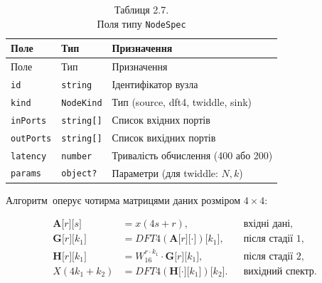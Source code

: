 \documentclass[
]{article}
\begin{document}
\begin{longtable}[]{@{}
  >{\raggedright\arraybackslash}p{}
  >{\raggedright\arraybackslash}p{}
  >{\raggedright\arraybackslash}p{}@{}}
\caption{Таблиця 2.7.\\
Поля типу \protect\texttt{NodeSpec}}\tabularnewline
\toprule\noalign{}
\begin{minipage}[b]{\linewidth}\raggedright
Поле
\end{minipage} & \begin{minipage}[b]{\linewidth}\raggedright
Тип
\end{minipage} & \begin{minipage}[b]{\linewidth}\raggedright
Призначення
\end{minipage} \\
\midrule\noalign{}
\endfirsthead
\toprule\noalign{}
\begin{minipage}[b]{\linewidth}\raggedright
Поле
\end{minipage} & \begin{minipage}[b]{\linewidth}\raggedright
Тип
\end{minipage} & \begin{minipage}[b]{\linewidth}\raggedright
Призначення
\end{minipage} \\
\midrule\noalign{}
\endhead
\bottomrule\noalign{}
\endlastfoot
\texttt{id} & \texttt{string} & Ідентифікатор вузла \\
\texttt{kind} & \texttt{NodeKind} & Тип (source, dft4, twiddle, sink) \\
\texttt{inPorts} & \texttt{string}\texttt{{[}{]}} & Список вхідних
портів \\
\texttt{outPorts} & \texttt{string}\texttt{{[}{]}} & Список вихідних
портів \\
\texttt{latency} & \texttt{number} & Тривалість обчислення (400 або
200) \\
\texttt{params} & \texttt{object}\texttt{?} & Параметри (для twiddle:
\(N,k\)) \\
\end{longtable}

Алгоритм~оперує чотирма матрицями даних розміром \(4 \times 4\):

\[\begin{aligned}
\mathbf{A}\lbrack r\rbrack\lbrack s\rbrack & = x(4s + r), & & \text{вхідні дані,} \\
\mathbf{G}\lbrack r\rbrack\lbrack k_{1}\rbrack & = DFT4(\mathbf{A}\lbrack r\rbrack\lbrack \cdot \rbrack)\lbrack k_{1}\rbrack, & & \text{після стадії 1,} \\
\mathbf{H}\lbrack r\rbrack\lbrack k_{1}\rbrack & = W_{16}^{r \cdot k_{1}} \cdot \mathbf{G}\lbrack r\rbrack\lbrack k_{1}\rbrack, & & \text{після стадії 2,} \\
X(4k_{1} + k_{2}) & = DFT4(\mathbf{H}\lbrack \cdot \rbrack\lbrack k_{1}\rbrack)\lbrack k_{2}\rbrack. & & \text{вихідний спектр.}
\end{aligned}\]
\end{document}
